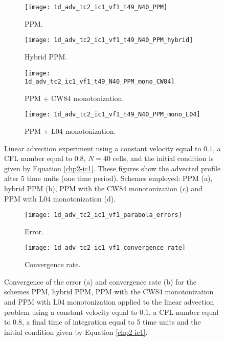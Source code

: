 \newpage
\begin{figure}[!htb]
  \centering
  \begin{subfigure}{0.45\textwidth}
    \centering
			\texttt{[image: 1d\_adv\_tc2\_ic1\_vf1\_t49\_N40\_PPM]}
			\caption{PPM.\label{chp2-sec-exp-adv1-a}}
  \end{subfigure}
  \begin{subfigure}{0.45\textwidth}
    \centering
			\texttt{[image: 1d\_adv\_tc2\_ic1\_vf1\_t49\_N40\_PPM\_hybrid]}
			\caption{Hybrid PPM.\label{chp2-sec-exp-adv1-b}}
  \end{subfigure}

  \begin{subfigure}{0.45\textwidth}
    \centering
		\texttt{[image: 1d\_adv\_tc2\_ic1\_vf1\_t49\_N40\_PPM\_mono\_CW84]}
    \caption{PPM + CW84 monotonization.\label{chp2-sec-exp-adv1-c}}
  \end{subfigure}
  \begin{subfigure}{0.45\textwidth}
    \centering
			\texttt{[image: 1d\_adv\_tc2\_ic1\_vf1\_t49\_N40\_PPM\_mono\_L04]}
      \caption{PPM + L04 monotonization.\label{chp2-sec-exp-adv1-d}}
  \end{subfigure} 
	\caption{Linear advection experiment using a constant velocity equal to $0.1$,
  a CFL number equal to $0.8$, $N=40$ cells, and the initial condition is given by Equation \eqref{chp2-ic1}.
	These figures show the advected profile after 5 time units (one time period).
	Schemes employed: PPM (a), hybrid PPM (b), PPM with the CW84 monotonization
	(c) and PPM with L04 monotonization (d). \label{chp2-sec-exp-adv1}}
\end{figure}

\begin{figure}[!htb]
  \centering
  \begin{subfigure}{0.45\textwidth}
    \centering
		\texttt{[image: 1d\_adv\_tc2\_ic1\_vf1\_parabola\_errors]}
		\caption{Error.\label{chp2-sec-exp-adv1-error}}
  \end{subfigure}
  \begin{subfigure}{0.45\textwidth}
    \centering
			\texttt{[image: 1d\_adv\_tc2\_ic1\_vf1\_convergence\_rate]}
		\caption{Convergence rate.\label{chp2-sec-exp-adv1-CR}}
  \end{subfigure}
	\caption{Convergence of the error (a) and convergence rate (b) for the schemes
  PPM, hybrid PPM, PPM with the CW84 monotonization and PPM with L04 monotonization
	applied to the linear advection problem using a constant velocity equal to $0.1$,
	a CFL number equal to $0.8$, a final time of integration equal to 5 time units
	and the initial condition given by Equation \eqref{chp2-ic1}.\label{chp2-sec-exp-adv1-2}}
\end{figure}

